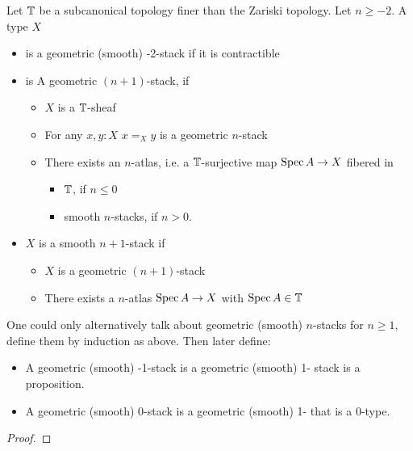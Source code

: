 \documentclass{article}
\begin{document}

\begin{definition}
Let $\mathbb{T}$ be a subcanonical topology finer than the Zariski topology. Let $n \ge -2$. A type $X$ 
    \begin{itemize}    
        \item is a geometric (smooth) -2-stack if it is contractible 
        \item is A geometric $(n+1)$-stack, if 
        \begin{itemize}
            \item $X$ is a $\mathbb{T}$-sheaf
            \item For any $x , y : X$ $x =_X y$ is a geometric $n$-stack
            \item There exists an $n$-atlas, i.e. a $\mathbb{T}$-surjective map $\operatorname{Spec} A \to X$ fibered in 
                \begin{itemize}
                    \item $\mathbb{T}$, if $n \le 0$
                    \item smooth $n$-stacks, if $ n > 0$. 
                \end{itemize}
        \end{itemize}
        \item $X$ is a smooth $n+1$-stack if
        \begin{itemize}
            \item $X$ is a geometric $(n+1)$-stack
            \item There exists a $n$-atlas $\operatorname{Spec} A \to X$ with $\operatorname{Spec} A \in \mathbb{T}$
        \end{itemize}
    \end{itemize}
    
\end{definition}
\begin{lemma}
One could only alternatively talk about geometric (smooth) $n$-stacks for $n \ge 1$, define them by induction as above. Then later define:
\begin{itemize}
     \item A geometric (smooth) -1-stack is a geometric (smooth) 1- stack is a proposition. \\
     \item A geometric (smooth) 0-stack is a geometric (smooth) 1-  that is a 0-type. \\    
\end{itemize}    
\end{lemma}
\begin{proof}
\end{proof}
\end{document}
